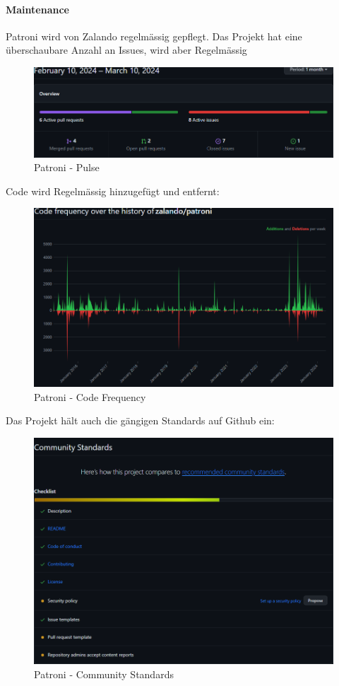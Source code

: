 \begin{flushleft}
    \paragraph{Maintenance}
    Patroni wird von Zalando regelmässig gepflegt.
    Das Projekt hat eine überschaubare Anzahl an Issues, wird aber Regelmässig
    \begin{figure}[H]
        \centering
        \includegraphics[width=0.75\linewidth]{source/implementation/evaluation/postgresql_ha_solutions/insights/patroni/pulse_zalando_patroni}
        \caption{Patroni - Pulse}
        \label{fig:pulse_zalando_patroni}
    \end{figure}

    Code wird Regelmässig hinzugefügt und entfernt:
    \begin{figure}[H]
        \centering
        \includegraphics[width=0.75\linewidth]{source/implementation/evaluation/postgresql_ha_solutions/insights/patroni/code_frequency_zalando_patroni}
        \caption{Patroni - Code Frequency}
        \label{fig:code_frequency_zalando_patroni}
    \end{figure}
    Das Projekt hält auch die gängigen Standards auf Github ein:
    \begin{figure}[H]
        \centering
        \includegraphics[width=0.75\linewidth]{source/implementation/evaluation/postgresql_ha_solutions/insights/patroni/community_Standards_zalando_patroni}
        \caption{Patroni - Community Standards}
        \label{fig:community_Standards_zalando_patroni}
    \end{figure}


\end{flushleft}
